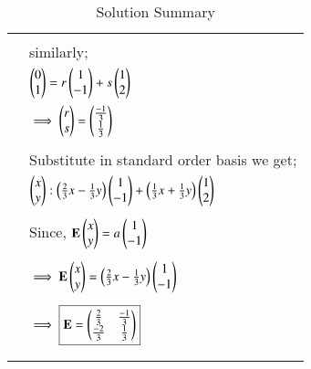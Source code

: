 \documentclass[journal,12pt]{IEEEtran}
\begin{document}
\begin{longtable}{|c|l|}
      &\\
      & similarly;\\
      & $\begin{pmatrix}0\\1\end{pmatrix}= r\begin{pmatrix}1\\-1\end{pmatrix} +s \begin{pmatrix}1\\2\end{pmatrix}$ \\
      & $\implies \begin{pmatrix}r\\s\end{pmatrix} = \begin{pmatrix}\frac{-1}{3}\\\frac{1}{3}\end{pmatrix}$\\
      &\\
      & Substitute in standard order basis we get;\\
      & $\begin{pmatrix}x\\y\end{pmatrix} : \begin{pmatrix}\frac{2}{3}x-\frac{1}{3}y\end{pmatrix}\begin{pmatrix}1\\-1\end{pmatrix}+\begin{pmatrix}\frac{1}{3}x+\frac{1}{3}y\end{pmatrix}\begin{pmatrix}1\\2\end{pmatrix}$\\
      &\\
      & Since, $\mathbf{E}\begin{pmatrix}x\\y\end{pmatrix} = a\begin{pmatrix}1\\-1\end{pmatrix}$\\
      & \\
      & $\implies\mathbf{E} \begin{pmatrix}x\\y\end{pmatrix} = \begin{pmatrix}\frac{2}{3}x-\frac{1}{3}y\end{pmatrix}\begin{pmatrix}1\\-1\end{pmatrix}$\\
      &\\
      & $\implies\boxed{ \mathbf{E}= \begin{pmatrix}\frac{2}{3}&\frac{-1}{3}\\\frac{-2}{3}& \frac{1}{3}\end{pmatrix}}$\\
      &\\
\hline
\caption{Solution Summary}
\label{table:1}
\end{longtable}
\end{document}
